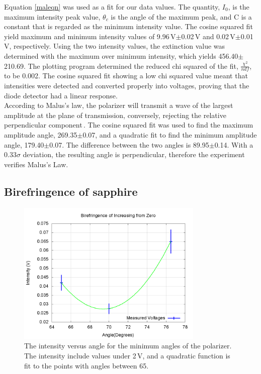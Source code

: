 \documentclass[aps,prl,twocolumn,superscriptaddress,nofootinbib]{revtex4-1}
\begin{document}
Equation \ref{maleqn} was used as a fit for our data values. The quantity, $I_0$, is the maximum intensity peak value, $\theta_c$ is the angle of the maximum peak, and C is a constant that is regarded as the minimum intensity value. The cosine squared fit yield maximum and minimum intensity values of 9.96\,V$\pm$0.02\,V and 0.02\,V$\pm$0.01\,V, respectively. Using the two intensity values, the extinction value was determined with the maximum over minimum intensity, which yields 456.40$\pm$210.69. The plotting program determined the reduced chi squared of the fit, $\frac{\chi^2}{ndf}$, to be 0.002. The cosine squared fit showing a low chi squared value meant that intensities were detected and converted properly into voltages, proving that the diode detector had a linear response.
\\
\indent According to Malus's law, the polarizer will transmit a wave of the largest amplitude at the plane of transmission, conversely, rejecting the relative perpendicular component\,\cite{4}. The cosine squared fit was used to find the maximum amplitude angle, 269.35\degree$\pm$0.07\degree, and a quadratic fit to find the minimum amplitude angle, 179.40\degree$\pm$0.07\degree. The difference between the two angles is 89.95\degree$\pm$0.14\degree. With a 0.33$\sigma$ deviation, the resulting angle is perpendicular, therefore the experiment verifies Malus's Law.

\subsection{Birefringence of sapphire}
\begin{figure}[h!]
  \begin{center}
\centerline{\includegraphics[width=3.5in]{bire1.png}}
\caption{\small{The intensity versus angle for the minimum angles of the polarizer. The intensity include values under 2\,V, and a quadratic function is fit to the points with angles between 65\degree. \label{bire1}}}
  \end{center}
\end{figure}
\vspace{-.7cm}
\end{document}
